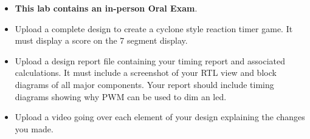 \begin{itemize}
    \item \textbf{This lab contains an in-person Oral Exam}.
    \item Upload a complete design to create a cyclone style reaction timer game. It must display a score on the 7 segment display. 
    \item Upload a design report file containing your timing report and associated calculations. It must include a screenshot of your RTL view and block diagrams of all major components. Your report should include timing diagrams showing why PWM can be used to dim an led.
    \item Upload a video going over each element of your design explaining the changes you made.
\end{itemize}